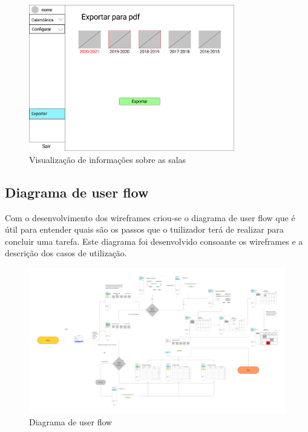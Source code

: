 \documentclass[11pt, twoside]{report}
\begin{document}
	
	\begin{figure}[H] 
		\centering 
		\includegraphics[width=0.8\textwidth,height=0.8\textheight,keepaspectratio]{image/prototipowireframes/exportarpdf}
		\caption{Visualização de informações sobre as salas}
		\label{exportar}
	\end{figure}
	
	
	\subsection{Diagrama de user flow}
	
	Com o desenvolvimento dos wireframes criou-se o diagrama de user flow que é útil para entender quais são os passos que o tuilizador terá de realizar para concluir uma tarefa. Este diagrama foi desenvolvido consoante os wireframes e a descrição dos casos de utilização.
	
	\begin{landscape}
		\pagestyle{empty}
		\begin{figure}[H] 
			\centering 							\includegraphics[width=1.5\textwidth,height=1.5\textheight,keepaspectratio]{image/diagramauserflow}
			\caption{Diagrama de user flow}
		\end{figure}
	\end{landscape}
	
\end{document}
